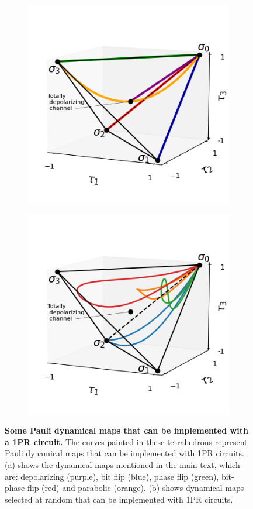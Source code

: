 \documentclass[10pt,letterpaper]{article} %
\begin{document}
\begin{figure} %
\captionsetup[subfigure]{justification=centering}
\centering
\begin{subfigure}{.45\textwidth}
  \centering
  \includegraphics[width=.9\linewidth]{images/curvas.png}
   \caption{}
  \label{fig:curves1}
\end{subfigure}%
\begin{subfigure}{.45\textwidth}
  \centering
  \includegraphics[width=.9\linewidth]{images/curvas-azar.png}
  \caption{}
  \label{fig:curves2}
\end{subfigure}
\caption{{\bf Some Pauli dynamical maps that can be implemented with a 1PR circuit.}
The curves painted in these tetrahedrons
represent Pauli dynamical maps that can be implemented with 1PR circuits.
(a) shows the dynamical maps mentioned in the main 
text, which are: depolarizing (purple), bit flip (blue),
phase flip (green), bit-phase flip (red)
and parabolic (orange).
(b) shows dynamical maps selected at random that can be implemented with 1PR 
circuits.}
\label{fig:curves}
\end{figure} %
\end{document}
